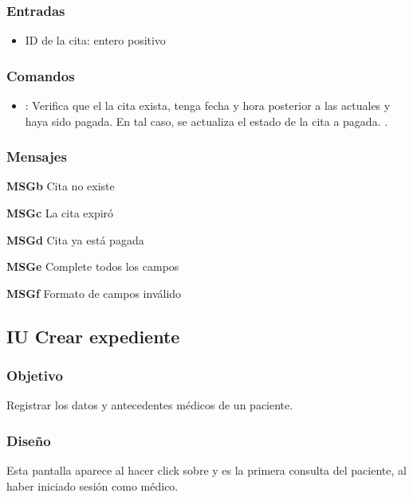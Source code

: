 \subsubsection{Entradas}
\begin{itemize}
	\item ID de la cita: entero positivo
\end{itemize}

\subsubsection{Comandos}
\begin{itemize}
	\item {}:  Verifica que el la cita exista, tenga fecha y hora posterior a las actuales y haya sido pagada. En tal caso, se actualiza el estado de la cita a pagada.  .	
\end{itemize}

\subsubsection{Mensajes}
\begin{Citemize}
	\item {\bf MSGb} Cita no existe
	\item {\bf MSGc} La cita expiró
	\item {\bf MSGd} Cita ya está pagada
	\item {\bf MSGe} Complete todos los campos
	\item {\bf MSGf} Formato de campos inválido
\end{Citemize}

\subsection{IU Crear expediente}

\subsubsection{Objetivo}
Registrar los datos y antecedentes médicos de un paciente.

\subsubsection{Diseño}
Esta pantalla aparece al hacer click sobre  y es la primera consulta del paciente, al haber iniciado sesión como médico.

